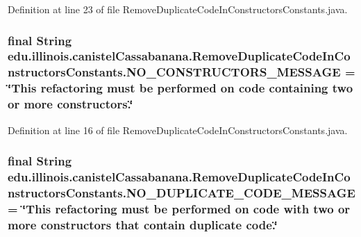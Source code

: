 Definition at line 23 of file RemoveDuplicateCodeInConstructorsConstants.java.

\hypertarget{classedu_1_1illinois_1_1canistelCassabanana_1_1RemoveDuplicateCodeInConstructorsConstants_a76b9ae1d61eebfbffcef6b6a07e99fa3}{
\subsubsection[{NO\_\-CONSTRUCTORS\_\-MESSAGE}]{\setlength{\rightskip}{0pt plus 5cm}final String {\bf edu.illinois.canistelCassabanana.RemoveDuplicateCodeInConstructorsConstants.NO\_\-CONSTRUCTORS\_\-MESSAGE} = \char`\"{}This refactoring must be performed on code containing two or more constructors.\char`\"{}}}
\label{classedu_1_1illinois_1_1canistelCassabanana_1_1RemoveDuplicateCodeInConstructorsConstants_a76b9ae1d61eebfbffcef6b6a07e99fa3}


Definition at line 16 of file RemoveDuplicateCodeInConstructorsConstants.java.

\hypertarget{classedu_1_1illinois_1_1canistelCassabanana_1_1RemoveDuplicateCodeInConstructorsConstants_a690b7d9efb6cfe6f9bb3b0cfbc9ba58f}{
\subsubsection[{NO\_\-DUPLICATE\_\-CODE\_\-MESSAGE}]{\setlength{\rightskip}{0pt plus 5cm}final String {\bf edu.illinois.canistelCassabanana.RemoveDuplicateCodeInConstructorsConstants.NO\_\-DUPLICATE\_\-CODE\_\-MESSAGE} = \char`\"{}This refactoring must be performed on code with two or more constructors that contain duplicate code.\char`\"{}}}
\label{classedu_1_1illinois_1_1canistelCassabanana_1_1RemoveDuplicateCodeInConstructorsConstants_a690b7d9efb6cfe6f9bb3b0cfbc9ba58f}


